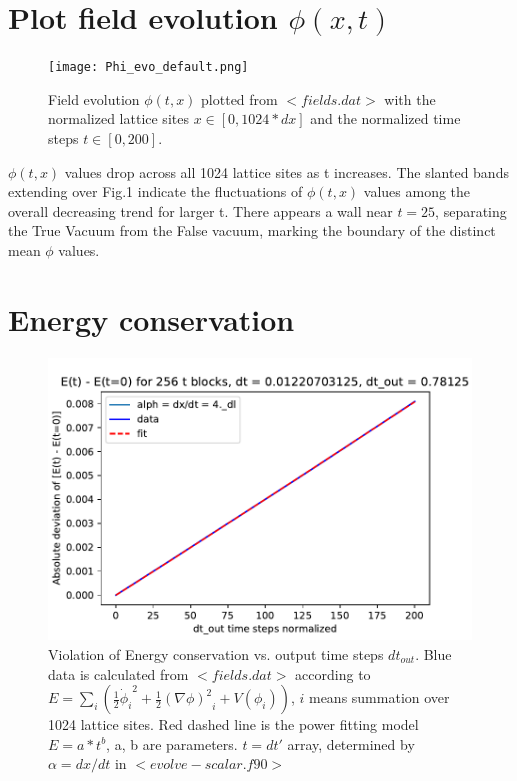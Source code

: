 \documentclass{article}
\begin{document}
\section{Plot field evolution $\phi(x, t)$}
\begin{figure}[H]
    \centering
    \texttt{[image: Phi\_evo\_default.png]}
    \caption{Field evolution $\phi(t, x)$ plotted from $<fields.dat>$ with the normalized lattice sites $x\in{[0, 1024*dx]}$ and the normalized time steps $t\in{[0, 200]}$.}
    \label{fig:Q3}
\end{figure}

$\phi(t, x)$ values drop across all 1024 lattice sites as t increases. The slanted bands extending over Fig.1 indicate the fluctuations of $\phi(t, x)$ values among the overall decreasing trend for larger t. There appears a wall near $t=25$, separating the True Vacuum from the False vacuum, marking the boundary of the distinct mean $\phi$ values. 

\section{Energy conservation}

\begin{figure}[H]
    \centering
    \includegraphics[scale=0.7]{E_dev_alph=4}
    \caption{Violation of Energy conservation vs. output time steps $dt_{out}$. Blue data is calculated from $<fields.dat>$ according to $E=\sum_i(\frac{1}{2}{\dot\phi_i}^2+\frac{1}{2}{(\nabla{\phi})^2}_i+V(\phi_i))$, $i$ means summation over 1024 lattice sites. Red dashed line is the power fitting model $E = a*{t}^b$, a, b are parameters. $t=dt'$ array, determined by $\alpha=dx/dt$ in $<evolve-scalar.f90>$}
    \label{fig:Q4}
\end{figure}
\end{document}
